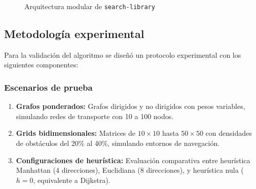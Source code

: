 \begin{figure}[H]
\centering
{}
\caption{Arquitectura modular de \texttt{search-library}}
\label{fig:architecture}
\end{figure}

\subsection{Metodología experimental}

Para la validación del algoritmo se diseñó un protocolo experimental con los siguientes componentes:

\subsubsection{Escenarios de prueba}

\begin{enumerate}
    \item \textbf{Grafos ponderados:} Grafos dirigidos y no dirigidos con pesos variables, simulando redes de transporte con 10 a 100 nodos.
    
    \item \textbf{Grids bidimensionales:} Matrices de $10 \times 10$ hasta $50 \times 50$ con densidades de obstáculos del 20\% al 40\%, simulando entornos de navegación.
    
    \item \textbf{Configuraciones de heurística:} Evaluación comparativa entre heurística Manhattan (4 direcciones), Euclidiana (8 direcciones), y heurística nula ($h = 0$, equivalente a Dijkstra).
\end{enumerate}

